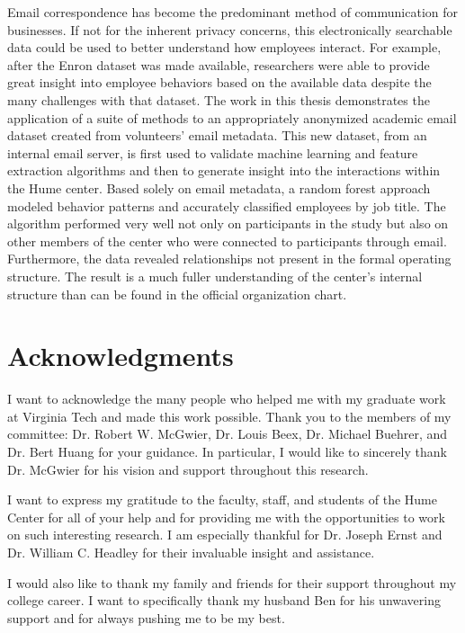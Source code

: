 \documentclass[12pt]{report}
\begin{document}
Email correspondence has become the predominant method of communication for businesses.
If not for the inherent privacy concerns, this electronically searchable data could be used to better understand how employees interact. 
For example, after the Enron dataset was made available, researchers were able to provide great insight into employee behaviors based on the available data despite the many challenges with that dataset.  
The work in this thesis demonstrates the application of a suite of methods to an appropriately anonymized academic email dataset created from volunteers' email metadata.  
This new dataset, from an internal email server, is first used to validate machine learning and feature extraction algorithms and then to generate insight into the interactions within the Hume center.  
Based solely on email metadata, a random forest approach modeled behavior patterns and accurately classified employees by job title.  
The algorithm performed very well not only on participants in the study but also on other members of the center who were connected to participants through email. 
Furthermore, the data revealed relationships not present in the formal operating structure. 
The result is a much fuller understanding of the center's internal structure than can be found in the official organization chart.


\vfill



\pagebreak

\chapter*{Acknowledgments}
I want to acknowledge the many people who helped me with my graduate work at Virginia Tech and made this work possible.  Thank you to the members of my committee: Dr. Robert W. McGwier, Dr. Louis Beex, Dr. Michael Buehrer, and Dr. Bert Huang for your guidance.  In particular, I would like to sincerely thank Dr. McGwier for his vision and support throughout this research.  

I want to express my gratitude to the faculty, staff, and students of the Hume Center for all of your help and for providing me with the opportunities to work on such interesting research.  I am especially thankful for Dr. Joseph Ernst and Dr. William C. Headley for their invaluable insight and assistance.

I would also like to thank my family and friends for their support throughout my college career.  I want to specifically thank my husband Ben for his unwavering support and for always pushing me to be my best.
\end{document}
